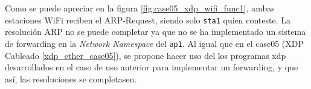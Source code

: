 Como se puede apreciar en la figura \ref{fig:case05_xdp_wifi_func1}, ambas estaciones WiFi reciben el ARP-Request, siendo solo \texttt{sta1} quien conteste. La resolución ARP no se puede completar ya que no se ha implementado un sistema de forwarding en la \textit{Network Namespace} del \texttt{ap1}. Al igual que en el case05 (XDP Cableado \ref{xdp_ether_case05}), se propone hacer uso del los programas \gls{xdp} desarrollados en el caso de uso anterior para implementar un forwarding, y que así, las resoluciones se completasen. 


